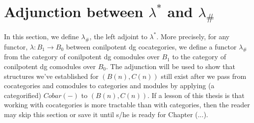 \section{Adjunction between $\lambda^*$ and $\lambda_\#$}
In this section, we define $\lambda_\#$, 
the left adjoint to $\lambda^*$. 
More precisely, for any functor, $\lambda:
B_1 \to B_0$ between 
conilpotent dg cocategories, 
we define a functor 
$\lambda_\#$ from the category of 
conilpotent dg comodules 
over $B_1$ to the category of 
conilpotent dg 
comodules over $B_0$.
The adjunction will be used to show 
that structures we've established 
for $(B(n), C(n))$ still exist 
after we pass from cocategories and 
comodules to categories and modules
by applying (a categorified) $Cobar(-)$ 
to $(B(n), C(n))$. If a lesson 
of this thesis is that working with
cocategories is more tractable 
than with categories, then the reader 
may skip this section or save it until 
s/he is ready for Chapter (...).
%

%
